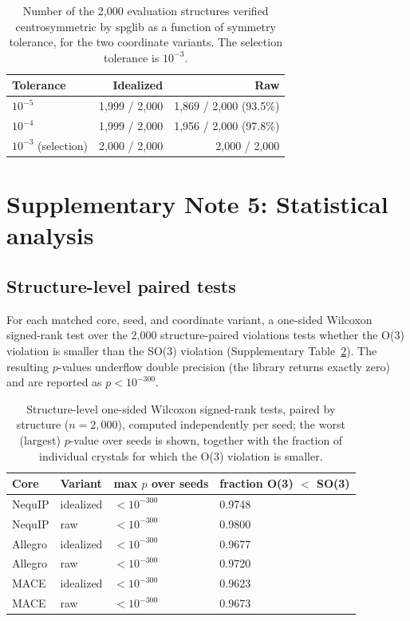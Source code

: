 \begin{table}[htbp]
\centering
\small
\caption{Number of the 2,000 evaluation structures verified centrosymmetric by spglib as a function of symmetry tolerance, for the two coordinate variants. The selection tolerance is $10^{-3}$.}
\label{stab:tolerance}
\begin{tabular}{lrr}
\toprule
Tolerance & Idealized & Raw \\
\midrule
$10^{-5}$ & 1,999 / 2,000 & 1,869 / 2,000 (93.5\%) \\
$10^{-4}$ & 1,999 / 2,000 & 1,956 / 2,000 (97.8\%) \\
$10^{-3}$ (selection) & 2,000 / 2,000 & 2,000 / 2,000 \\
\bottomrule
\end{tabular}
\end{table}

\section*{Supplementary Note 5: Statistical analysis}

\subsection*{Structure-level paired tests}

For each matched core, seed, and coordinate variant, a one-sided Wilcoxon signed-rank test over the 2,000 structure-paired violations tests whether the O(3) violation is smaller than the SO(3) violation (Supplementary Table~\ref{stab:wilcoxon}). The resulting $p$-values underflow double precision (the library returns exactly zero) and are reported as $p<10^{-300}$.

\begin{table}[htbp]
\centering
\small
\caption{Structure-level one-sided Wilcoxon signed-rank tests, paired by structure ($n = 2{,}000$), computed independently per seed; the worst (largest) $p$-value over seeds is shown, together with the fraction of individual crystals for which the O(3) violation is smaller.}
\label{stab:wilcoxon}
\begin{tabular}{llll}
\toprule
Core & Variant & max $p$ over seeds & fraction O(3) $<$ SO(3) \\
\midrule
NequIP & idealized & $<10^{-300}$ & 0.9748 \\
NequIP & raw & $<10^{-300}$ & 0.9800 \\
Allegro & idealized & $<10^{-300}$ & 0.9677 \\
Allegro & raw & $<10^{-300}$ & 0.9720 \\
MACE & idealized & $<10^{-300}$ & 0.9623 \\
MACE & raw & $<10^{-300}$ & 0.9673 \\
\bottomrule
\end{tabular}
\end{table}

